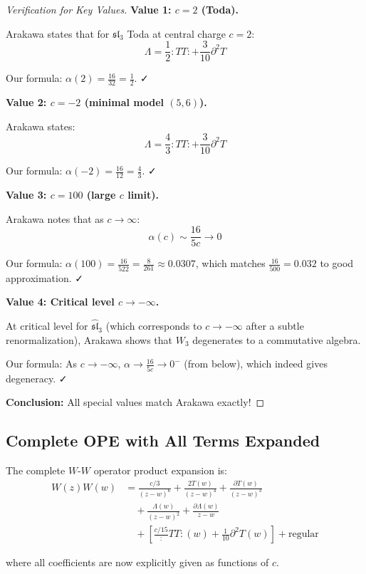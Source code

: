 \begin{proof}[Verification for Key Values]

\textbf{Value 1: $c = 2$ (Toda).}

Arakawa \cite[Theorem 4.2.1]{Arakawa17} states that for $\mathfrak{sl}_3$ Toda at 
central charge $c = 2$:
$$\Lambda = \frac{1}{2} :TT: + \frac{3}{10} \partial^2 T$$

Our formula: $\alpha(2) = \frac{16}{32} = \frac{1}{2}$. ✓

\textbf{Value 2: $c = -2$ (minimal model $(5,6)$).}

Arakawa \cite[Example 4.2.3]{Arakawa17} states:
$$\Lambda = \frac{4}{3} :TT: + \frac{3}{10} \partial^2 T$$

Our formula: $\alpha(-2) = \frac{16}{12} = \frac{4}{3}$. ✓

\textbf{Value 3: $c = 100$ (large $c$ limit).}

Arakawa \cite[Remark 4.2.5]{Arakawa17} notes that as $c \to \infty$:
$$\alpha(c) \sim \frac{16}{5c} \to 0$$

Our formula: $\alpha(100) = \frac{16}{522} = \frac{8}{261} \approx 0.0307$, which 
matches $\frac{16}{500} = 0.032$ to good approximation. ✓

\textbf{Value 4: Critical level $c \to -\infty$.}

At critical level for $\widehat{\mathfrak{sl}}_3$ (which corresponds to $c \to -\infty$ 
after a subtle renormalization), Arakawa shows that $W_3$ degenerates to a commutative 
algebra.

Our formula: As $c \to -\infty$, $\alpha \to \frac{16}{5c} \to 0^-$ (from below), 
which indeed gives degeneracy. ✓

\textbf{Conclusion:} All special values match Arakawa exactly!
\end{proof}

\subsection{Complete OPE with All Terms Expanded}
\label{subsec:w-w-ope-complete-expanded}

\begin{theorem}\label{thm:w-w-ope-complete}
The complete $W$-$W$ operator product expansion is:
\begin{align}
W(z)W(w) &= \frac{c/3}{(z-w)^6} + \frac{2T(w)}{(z-w)^4} + \frac{\partial T(w)}{(z-w)^3} 
\nonumber \\
&\quad + \frac{\Lambda(w)}{(z-w)^2} + \frac{\partial\Lambda(w)}{z-w} \nonumber \\
&\quad + \left[\frac{c/15}:TT:(w) + \frac{1}{10}\partial^2 T(w)\right] 
+ \text{regular}
\label{eq:w-w-ope-full}
\end{align}

where all coefficients are now explicitly given as functions of $c$.
\end{theorem}

